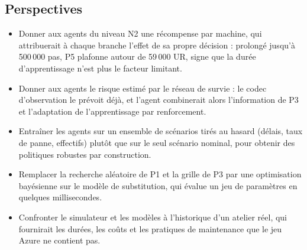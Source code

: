 \subsection{Perspectives}

\begin{itemize}
\item Donner aux agents du niveau N2 une récompense par machine, qui attribuerait à chaque branche l'effet de sa propre décision : prolongé jusqu'à 500\,000 pas, P5 plafonne autour de 59\,000 UR, signe que la durée d'apprentissage n'est plus le facteur limitant.
\item Donner aux agents le risque estimé par le réseau de survie : le codec d'observation le prévoit déjà, et l'agent combinerait alors l'information de P3 et l'adaptation de l'apprentissage par renforcement.
\item Entraîner les agents sur un ensemble de scénarios tirés au hasard (délais, taux de panne, effectifs) plutôt que sur le seul scénario nominal, pour obtenir des politiques robustes par construction.
\item Remplacer la recherche aléatoire de P1 et la grille de P3 par une optimisation bayésienne sur le modèle de substitution, qui évalue un jeu de paramètres en quelques millisecondes.
\item Confronter le simulateur et les modèles à l'historique d'un atelier réel, qui fournirait les durées, les coûts et les pratiques de maintenance que le jeu Azure ne contient pas.
\end{itemize}
